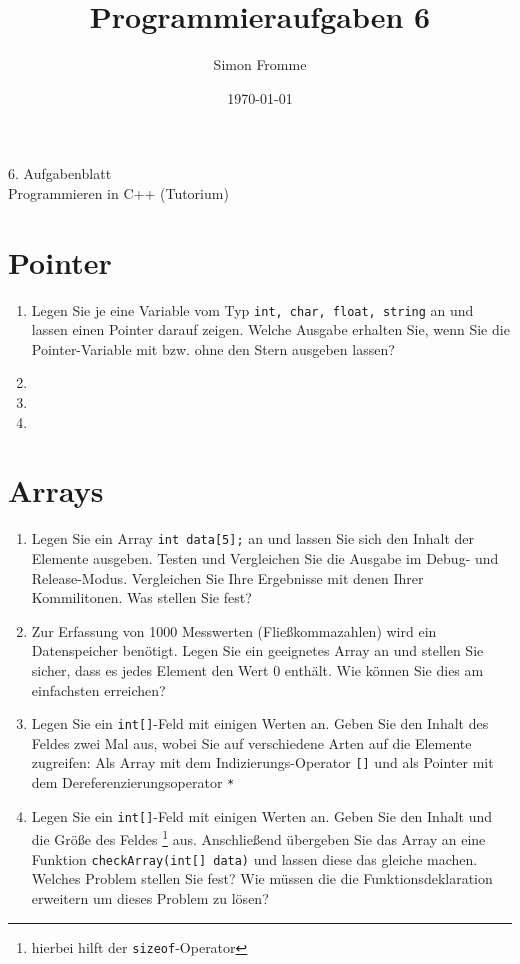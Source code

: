 \documentclass[paper=a4, fontsize=11pt, twoside]{scrartcl}
\title{Programmieraufgaben 6}
\author{Simon Fromme}
\date{\normalsize\today}
\begin{document}
\vspace*{0.75\baselineskip}
\begin{center}
  \Large 6. Aufgabenblatt \\\vspace{0.5em} \large Programmieren in C++ (Tutorium)
\end{center}

\section*{Pointer}
\begin{enumerate}
  \item Legen Sie je eine Variable vom Typ \texttt{int, char, float, string} an und lassen einen Pointer darauf zeigen. Welche Ausgabe erhalten Sie, wenn Sie die Pointer-Variable mit bzw. ohne den Stern ausgeben lassen?
  \item 
  \item 
  \item 
\end{enumerate}

\section*{Arrays}
\begin{enumerate}
  \item Legen Sie ein Array \texttt{int data[5];} an und lassen Sie sich den Inhalt der Elemente ausgeben. Testen und Vergleichen Sie die Ausgabe im Debug- und Release-Modus. Vergleichen Sie Ihre Ergebnisse mit denen Ihrer Kommilitonen. Was stellen Sie fest?
  \item Zur Erfassung von 1000 Messwerten (Fließkommazahlen) wird ein Datenspeicher benötigt. Legen Sie ein geeignetes Array an und stellen Sie sicher, dass es jedes Element den Wert 0 enthält. Wie können Sie dies am einfachsten erreichen?
  \item Legen Sie ein \texttt{int[]}-Feld mit einigen Werten an. Geben Sie den Inhalt des Feldes zwei Mal aus, wobei Sie auf verschiedene Arten auf die Elemente zugreifen: Als Array mit dem Indizierungs-Operator \texttt{[]} und als Pointer mit dem Dereferenzierungsoperator \texttt{*}
  \item Legen Sie ein \texttt{int[]}-Feld mit einigen Werten an. Geben Sie den Inhalt und die Größe des Feldes \footnote{hierbei hilft der \texttt{sizeof}-Operator} aus. Anschließend übergeben Sie das Array an eine Funktion \texttt{checkArray(int[] data)} und lassen diese das gleiche machen. Welches Problem stellen Sie fest? Wie müssen die die Funktionsdeklaration erweitern um dieses Problem zu lösen?
\end{enumerate}
\end{document}
